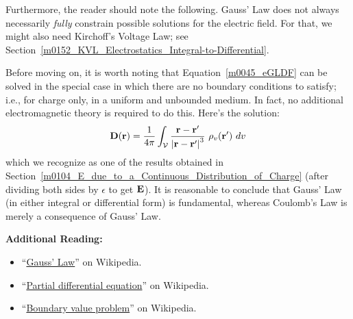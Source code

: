 Furthermore, the reader should note the following. Gauss' Law does not always necessarily \emph{fully} constrain possible solutions for the electric field.  For that, we might also need Kirchoff's Voltage Law; 
see Section~\ref{m0152_KVL_Electrostatics_Integral-to-Differential}.

Before moving on, it is worth noting that Equation~\ref{m0045_eGLDF} can be solved in the special case in which there are no boundary conditions to satisfy; i.e., for charge only, in a uniform and unbounded medium.  In fact, no additional electromagnetic theory is required to do this. Here's the solution:
%
\begin{equation}
{\bf D}({\bf r}) = \frac{1}{4\pi} \int_{\mathcal V} {   \frac{{\bf r}-{\bf r}'}{\left|{\bf r}-{\bf r}'\right|^3}~\rho_v({\bf r}')~dv}
\end{equation}
%
which we recognize as one of the results obtained in Section~\ref{m0104_E_due_to_a_Continuous_Distribution_of_Charge} (after dividing both sides by $\epsilon$ to get ${\bf E}$).
It is reasonable to conclude that Gauss' Law (in either integral or differential form) is fundamental, whereas Coulomb's Law 
is merely a consequence of Gauss' Law.


{\bf Additional Reading:}
\begin{itemize}
\item ``\href{https://en.wikipedia.org/wiki/Gauss'_law}{Gauss' Law}'' on Wikipedia.
\item ``\href{https://en.wikipedia.org/wiki/Partial_differential_equation}{Partial differential equation}'' on Wikipedia.
\item ``\href{https://en.wikipedia.org/wiki/Boundary_value_problem}{Boundary value problem}'' on Wikipedia.
\end{itemize}


